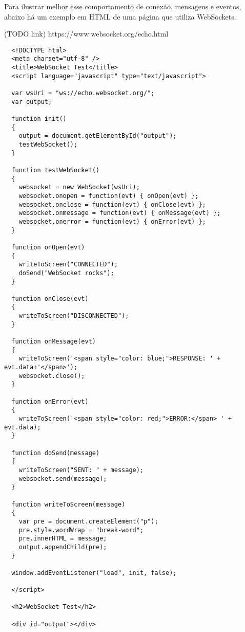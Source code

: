 \documentclass[a4paper,12pt]{article}
\begin{document}



Para ilustrar melhor esse comportamento de conexão, mensagens e eventos, abaixo há um exemplo em HTML de uma página que utiliza WebSockets.

(TODO link)
https://www.websocket.org/echo.html

\begin{small}
\begin{verbatim}
  <!DOCTYPE html>
  <meta charset="utf-8" />
  <title>WebSocket Test</title>
  <script language="javascript" type="text/javascript">

  var wsUri = "ws://echo.websocket.org/";
  var output;

  function init()
  {
    output = document.getElementById("output");
    testWebSocket();
  }

  function testWebSocket()
  {
    websocket = new WebSocket(wsUri);
    websocket.onopen = function(evt) { onOpen(evt) };
    websocket.onclose = function(evt) { onClose(evt) };
    websocket.onmessage = function(evt) { onMessage(evt) };
    websocket.onerror = function(evt) { onError(evt) };
  }

  function onOpen(evt)
  {
    writeToScreen("CONNECTED");
    doSend("WebSocket rocks");
  }

  function onClose(evt)
  {
    writeToScreen("DISCONNECTED");
  }

  function onMessage(evt)
  {
    writeToScreen('<span style="color: blue;">RESPONSE: ' + evt.data+'</span>');
    websocket.close();
  }

  function onError(evt)
  {
    writeToScreen('<span style="color: red;">ERROR:</span> ' + evt.data);
  }

  function doSend(message)
  {
    writeToScreen("SENT: " + message);
    websocket.send(message);
  }

  function writeToScreen(message)
  {
    var pre = document.createElement("p");
    pre.style.wordWrap = "break-word";
    pre.innerHTML = message;
    output.appendChild(pre);
  }

  window.addEventListener("load", init, false);

  </script>

  <h2>WebSocket Test</h2>

  <div id="output"></div>

\end{verbatim}
\end{small}
\end{document}
